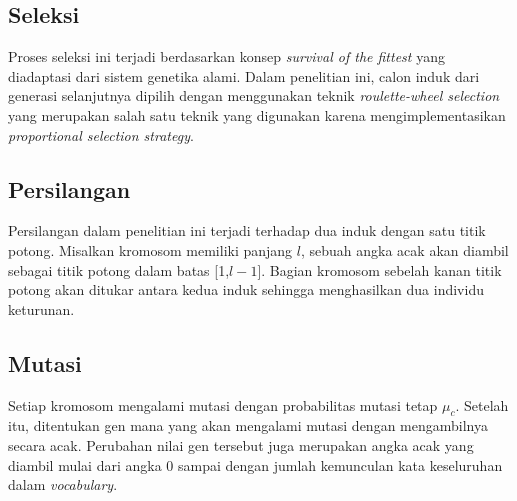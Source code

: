 \subsection{Seleksi}
Proses seleksi ini terjadi berdasarkan konsep \textit{survival of the fittest} yang diadaptasi dari sistem genetika alami. Dalam penelitian ini, calon induk dari generasi selanjutnya dipilih dengan menggunakan teknik \textit{roulette-wheel selection} yang merupakan salah satu teknik yang digunakan karena mengimplementasikan \textit{proportional selection strategy}.

\subsection{Persilangan}
Persilangan dalam penelitian ini terjadi terhadap dua induk dengan satu titik potong. Misalkan kromosom memiliki panjang $l$, sebuah angka acak akan diambil sebagai titik potong dalam batas [1,$l-1$]. Bagian kromosom sebelah kanan titik potong akan ditukar  antara kedua induk sehingga menghasilkan dua individu keturunan.

\subsection{Mutasi}
Setiap kromosom mengalami mutasi dengan probabilitas mutasi tetap $\mu_c$. Setelah itu, ditentukan gen mana yang akan mengalami mutasi dengan mengambilnya secara acak. Perubahan nilai gen tersebut juga merupakan angka acak yang diambil mulai dari angka 0 sampai dengan jumlah kemunculan kata keseluruhan dalam \textit{vocabulary}.

%
